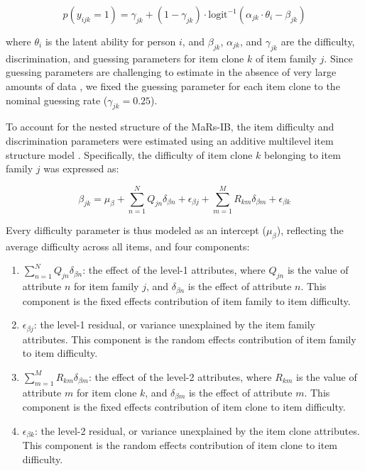 \documentclass[a4paper,man,natbib]{apa6}
\begin{document}
\begin{equation} \label{eq:1}
p(y_{ijk} = 1) = \gamma_{jk} + (1-\gamma_{jk}) \cdot \text{logit}^{-1} \left( \alpha_{jk} \cdot \theta_i - \beta_{jk} \right)
\end{equation}

\noindent where $\theta_i$ is the latent ability for person $i$, and $\beta_{jk}$, $\alpha_{jk}$, and $\gamma_{jk}$ are the difficulty, discrimination, and guessing parameters for item clone $k$ of item family $j$. Since guessing parameters are challenging to estimate in the absence of very large amounts of data \citep{han2012fixing}, we fixed the guessing parameter for each item clone to the nominal guessing rate ($\gamma_{jk} = 0.25$).

To account for the nested structure of the MaRs-IB, the item difficulty and discrimination parameters were estimated using an additive multilevel item structure model \citep{cho2014additive}. Specifically, the difficulty of item clone $k$ belonging to item family $j$ was expressed as:  

\begin{equation}
\beta_{jk} = \mu_\beta + \sum_{n=1}^N Q_{jn} \delta_{\beta n} + \epsilon_{\beta j} + \sum_{m=1}^M R_{km} \delta_{\beta m} + \epsilon_{\beta k}
\end{equation}

\noindent Every difficulty parameter is thus modeled as an intercept ($\mu_\beta$), reflecting the average difficulty across all items, and four components:

\begin{enumerate}

\item $\sum_{n=1}^N Q_{jn} \delta_{\beta n}$: the effect of the level-1 attributes, where $Q_{jn}$ is the value of attribute $n$ for item family $j$, and $\delta_{\beta n}$ is the effect of attribute $n$. This component is the fixed effects contribution of item family to item difficulty.

\item $\epsilon_{\beta j}$: the level-1 residual, or variance unexplained by the item family attributes. This component is the random effects contribution of item family to item difficulty.

\item $\sum_{m=1}^M R_{km} \delta_{\beta m}$: the effect of the level-2 attributes, where $R_{km}$ is the value of attribute $m$ for item clone $k$, and $\delta_{\beta m}$ is the effect of attribute $m$. This component is the fixed effects contribution of item clone to item difficulty.

\item $\epsilon_{\beta k}$: the level-2 residual, or variance unexplained by the item clone attributes. This component is the random effects contribution of item clone to item difficulty.

\end{enumerate}
\end{document}
